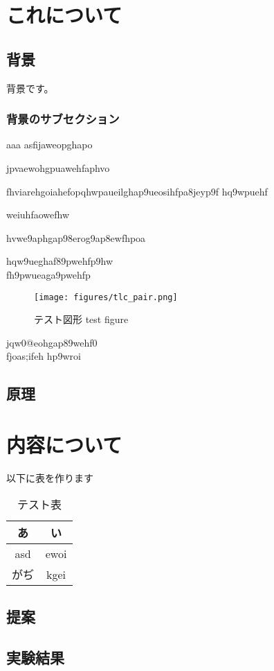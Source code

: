 \documentclass[11pt]{jsarticle}
\newcommand{\newsection}[1]{\clearpage \vspace*{24zw} \section{#1} \clearpage}
\begin{document}
\tableofcontents
\clearpage

\newsection{これについて}

\subsection{背景}
背景です。
\subsubsection{背景のサブセクション}
aaa
asfijaweopghapo



jpvaewohgpuawehfaphvo

fhviarehgoiahefopqhwpaueilghap9ueosihfpa8jeyp9f
hq9wpuehf

weiuhfaowefhw

hvwe9aphgap98erog9ap8ewfhpoa

hqw9ueghaf89pwehfp9hw\\
fh9pwueaga9pwehfp

\begin{figure}[H]
	\centering
	\texttt{[image: figures/tlc\_pair.png]}
	\caption{テスト図形 test figure}
	\label{fig:test}
\end{figure}%


jqw0@eohgap89wehf0\\
fjoas;ifeh
hp9wroi
\subsection{原理}
\newsection{内容について}
以下に表を作ります
\begin{table}
	\centering
	\caption{テスト表}
	\label{tab:test}
	\begin{tabular}{|c|c|} \hline
		あ & い　\\ \hline
		asd & ewoi \\ \hline
		がぢ & kgei \\ \hline
	\end{tabular}
\end{table}
	
\subsection{提案}
\subsection{実験結果}
\end{document}
